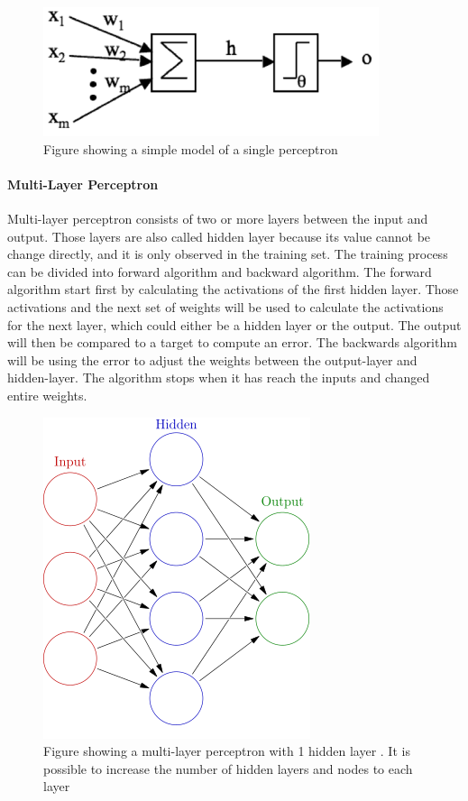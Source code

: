 \documentclass[USenglish]{ifimaster}  %
\begin{document}
	
\begin{figure}[h]
	\centering
	\includegraphics[scale=0.9]{Figures/neuron.PNG}
	\caption{Figure showing a simple model of a single perceptron \cite{Marsland:2009:MLA:1571643}}
	\label{fig:NN}
\end{figure}
	
\paragraph{Multi-Layer Perceptron}
Multi-layer perceptron consists of two or more layers between the input and output. Those layers are also called hidden layer because its value cannot be change directly, and it is only observed in the training set. The training process can be divided into forward algorithm and backward algorithm. The forward algorithm start first by calculating the activations of the first hidden layer. Those activations and the next set of weights will be used to calculate the activations for the next layer, which could either be a hidden layer or the output. The output will then be compared to a target to compute an error. The backwards algorithm will be using the error to adjust the weights between the output-layer and hidden-layer. The algorithm stops when it has reach the inputs and changed entire weights.
	
	
\begin{figure}[h]
	\centering
	\includegraphics[scale=0.6]{Figures/MLP.png}
	\caption{Figure showing a multi-layer perceptron with 1 hidden layer \cite{MLP}. It is possible to increase the number of hidden layers and nodes to each layer}
	\label{fig:MLP}
\end{figure}
	
\end{document}
